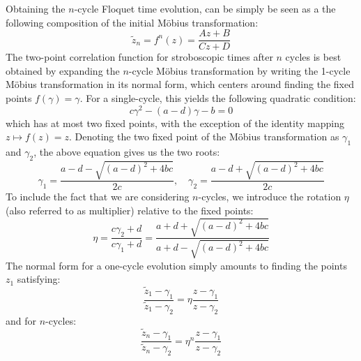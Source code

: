 \documentclass[11pt, a4paper, oneside]{book}
\theoremstyle{definition} %
\begin{document}

%
Obtaining the $n$-cycle Floquet time evolution, can be simply be seen as a the following composition of the initial Möbius transformation:
\begin{equation}
	\tilde{z}_n = f^n(z) = \frac{Az + B}{Cz + D}
	\label{Möbius_Transformation}
\end{equation}
The two-point correlation function for stroboscopic times after $n$ cycles is best obtained by expanding the $n$-cycle Möbius transformation by writing the 1-cycle Möbius transformation in its normal form, which centers around finding the fixed points $f(\gamma) = \gamma$. For a single-cycle, this yields the following quadratic condition:
\begin{equation}
	c\gamma^2 - (a-d)\gamma - b = 0
\end{equation}
which has at most two fixed points, with the exception of the identity mapping $z \mapsto f(z) = z$. Denoting the two fixed point of the Möbius transformation as $\gamma_{1}$ and $\gamma_2$, the above equation gives us the two roots:
\begin{equation}
	\gamma_{1} = \frac{a - d - \sqrt{(a-d)^2 + 4bc}}{2c}, \quad \gamma_2 = \frac{a - d + \sqrt{(a-d)^2 + 4bc}}{2c}
\end{equation}
To include the fact that we are considering $n$-cycles, we introduce the rotation $\eta$ (also referred to as multiplier) relative to the fixed points:
\begin{equation}
	\eta = \frac{c\gamma_2 + d}{c \gamma_1 + d} = \frac{a + d + \sqrt{(a-d)^2 + 4bc}}{a + d - \sqrt{(a-d)^2 + 4bc}}
	\label{eq:multiplier}
\end{equation}
The normal form for a one-cycle evolution simply amounts to finding the points $z_1$ satisfying:
\begin{equation}
	\frac{\tilde{z}_1 - \gamma_1}{\tilde{z}_1 - \gamma_2} = \eta \frac{z - \gamma_1}{z - \gamma_2}
\end{equation}
and for $n$-cycles:
\begin{equation}
	\frac{\tilde{z}_n - \gamma_1}{\tilde{z}_n - \gamma_2} = \eta^n \frac{z - \gamma_1}{z - \gamma_2}
\end{equation}
\end{document}
